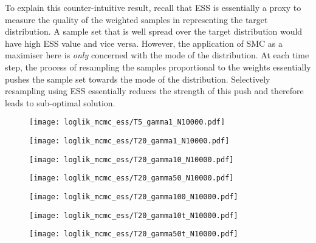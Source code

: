 To explain this counter-intuitive result, recall that ESS is essentially a proxy to measure the quality of the weighted samples in representing the target distribution. A sample set that is well spread over the target distribution would have high ESS value and vice versa. However, the application of SMC as a maximiser here is \emph{only} concerned with the mode of the distribution. At each time step, the process of resampling the samples proportional to the weights essentially pushes the sample set towards the mode of the distribution. Selectively resampling using ESS essentially reduces the strength of this push and therefore leads to sub-optimal solution.

\begin{figure}[!thbp]
    \centering
    \begin{minipage}{.5\textwidth}
        \centering
        \texttt{[image: loglik\_mcmc\_ess/T5\_gamma1\_N10000.pdf]}
      
    \end{minipage}%
    \begin{minipage}{0.5\textwidth}
        \centering
        \texttt{[image: loglik\_mcmc\_ess/T20\_gamma1\_N10000.pdf]}
      
    \end{minipage}
    \begin{minipage}{0.5\textwidth}
        \centering
        \texttt{[image: loglik\_mcmc\_ess/T20\_gamma10\_N10000.pdf]}
      
    \end{minipage}%
    \begin{minipage}{0.5\textwidth}
        \centering
        \texttt{[image: loglik\_mcmc\_ess/T20\_gamma50\_N10000.pdf]}
      
    \end{minipage}
    \begin{minipage}{0.5\textwidth}
        \centering
        \texttt{[image: loglik\_mcmc\_ess/T20\_gamma100\_N10000.pdf]}
      
    \end{minipage}%
    \begin{minipage}{0.5\textwidth}
        \centering
        \texttt{[image: loglik\_mcmc\_ess/T20\_gamma10t\_N10000.pdf]}
      
    \end{minipage}
    \begin{minipage}{0.5\textwidth}
        \centering
        \texttt{[image: loglik\_mcmc\_ess/T20\_gamma50t\_N10000.pdf]}
      

\end{minipage}
\end{figure}
